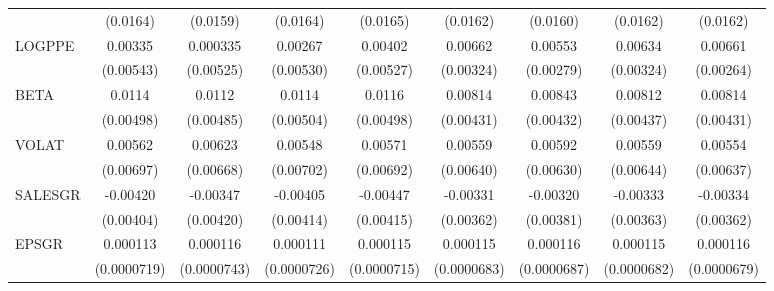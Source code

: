 \begin{table}[htbp]
\begin{tabular}{l*{8}{c}}
                    &    (0.0164)         &    (0.0159)         &    (0.0164)         &    (0.0165)         &    (0.0162)         &    (0.0160)         &    (0.0162)         &    (0.0162)         \\
LOGPPE              &     0.00335         &    0.000335         &     0.00267         &     0.00402         &     0.00662\sym{**} &     0.00553\sym{*}  &     0.00634\sym{*}  &     0.00661\sym{**} \\
                    &   (0.00543)         &   (0.00525)         &   (0.00530)         &   (0.00527)         &   (0.00324)         &   (0.00279)         &   (0.00324)         &   (0.00264)         \\
BETA                &      0.0114\sym{**} &      0.0112\sym{**} &      0.0114\sym{**} &      0.0116\sym{**} &     0.00814\sym{*}  &     0.00843\sym{*}  &     0.00812\sym{*}  &     0.00814\sym{*}  \\
                    &   (0.00498)         &   (0.00485)         &   (0.00504)         &   (0.00498)         &   (0.00431)         &   (0.00432)         &   (0.00437)         &   (0.00431)         \\
VOLAT               &     0.00562         &     0.00623         &     0.00548         &     0.00571         &     0.00559         &     0.00592         &     0.00559         &     0.00554         \\
                    &   (0.00697)         &   (0.00668)         &   (0.00702)         &   (0.00692)         &   (0.00640)         &   (0.00630)         &   (0.00644)         &   (0.00637)         \\
SALESGR             &    -0.00420         &    -0.00347         &    -0.00405         &    -0.00447         &    -0.00331         &    -0.00320         &    -0.00333         &    -0.00334         \\
                    &   (0.00404)         &   (0.00420)         &   (0.00414)         &   (0.00415)         &   (0.00362)         &   (0.00381)         &   (0.00363)         &   (0.00362)         \\
EPSGR               &    0.000113         &    0.000116         &    0.000111         &    0.000115         &    0.000115\sym{*}  &    0.000116\sym{*}  &    0.000115\sym{*}  &    0.000116\sym{*}  \\
                    & (0.0000719)         & (0.0000743)         & (0.0000726)         & (0.0000715)         & (0.0000683)         & (0.0000687)         & (0.0000682)         & (0.0000679)         \\

\end{tabular}
\end{table}

